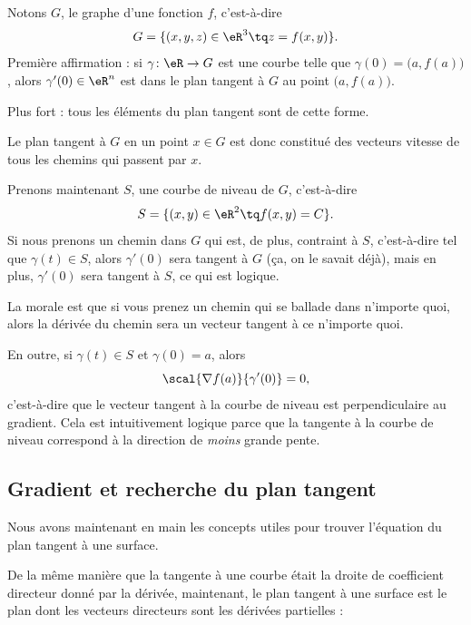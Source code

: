 Notons \( G\), le graphe d'une fonction \( f\), c'est-à-dire
\begin{equation}
	G=\{ (x,y,z)\in\eR^3\tq z=f(x,y) \}.
\end{equation}
Première affirmation : si \( \gamma\colon \eR\to G\) est une courbe telle que \( \gamma(0)=\big( a,f(a) \big)\), alors \( \gamma'(0)\in\eR^n\) est dans le plan tangent à \( G\) au point \( \big( a,f(a) \big)\).

Plus fort : tous les éléments du plan tangent sont de cette forme.

Le plan tangent à \( G\) en un point \( x\in G\) est donc constitué des vecteurs vitesse de tous les chemins qui passent par \( x\).

Prenons maintenant \( S\), une courbe de niveau de \( G\), c'est-à-dire
\begin{equation}
	S=\{ (x,y)\in\eR^2\tq f(x,y)=C \}.
\end{equation}
Si nous prenons un chemin dans \( G\) qui est, de plus, contraint à \( S\), c'est-à-dire tel que \( \gamma(t)\in S\), alors \( \gamma'(0)\) sera tangent à \( G\) (ça, on le savait déjà), mais en plus, \( \gamma'(0)\) sera tangent à \( S\), ce qui est logique.

La morale est que si vous prenez un chemin qui se ballade dans n'importe quoi, alors la dérivée du chemin sera un vecteur tangent à ce n'importe quoi.

En outre, si \( \gamma(t)\in S\) et \( \gamma(0)=a\), alors
\begin{equation}
	\scal{\nabla f(a)}{\gamma'(0)}=0,
\end{equation}
c'est-à-dire que le vecteur tangent à la courbe de niveau est perpendiculaire au gradient. Cela est intuitivement logique parce que la tangente à la courbe de niveau correspond à la direction de \emph{moins} grande pente.

\subsection{Gradient et recherche du plan tangent}

Nous avons maintenant en main les concepts utiles pour trouver l'équation du plan tangent à une surface.

De la même manière que la tangente à une courbe était la droite de coefficient directeur donné par la dérivée, maintenant, le plan tangent à une surface est le plan dont les vecteurs directeurs sont les dérivées partielles :

